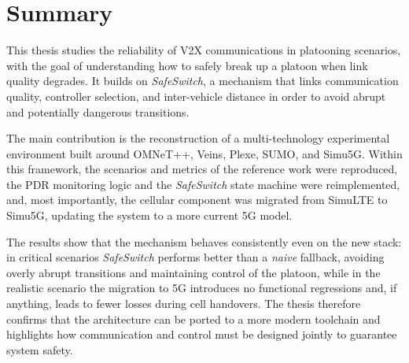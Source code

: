 \chapter*{Summary}
This thesis studies the reliability of V2X communications in platooning scenarios, with the goal of understanding how to safely break up a platoon when link quality degrades. It builds on \emph{SafeSwitch}, a mechanism that links communication quality, controller selection, and inter-vehicle distance in order to avoid abrupt and potentially dangerous transitions.

The main contribution is the reconstruction of a multi-technology experimental environment built around OMNeT++, Veins, Plexe, SUMO, and Simu5G. Within this framework, the scenarios and metrics of the reference work were reproduced, the PDR monitoring logic and the \emph{SafeSwitch} state machine were reimplemented, and, most importantly, the cellular component was migrated from SimuLTE to Simu5G, updating the system to a more current 5G model.

The results show that the mechanism behaves consistently even on the new stack: in critical scenarios \emph{SafeSwitch} performs better than a \emph{naive} fallback, avoiding overly abrupt transitions and maintaining control of the platoon, while in the realistic scenario the migration to 5G introduces no functional regressions and, if anything, leads to fewer losses during cell handovers. The thesis therefore confirms that the architecture can be ported to a more modern toolchain and highlights how communication and control must be designed jointly to guarantee system safety.
